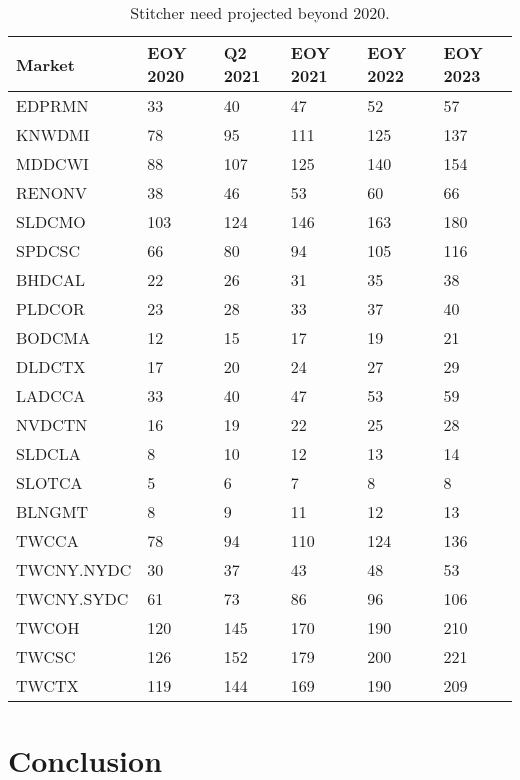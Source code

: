 \documentclass{article}
\begin{document}
\begin{table}
\begin{tabular}{|l|p{16mm}|p{16mm}|p{16mm}|p{16mm}|p{16mm}|} 
\hline Market & EOY 2020 & Q2 2021 & EOY 2021 & EOY 2022 & EOY 2023\\
\hline EDPRMN & 33  &   40 & 	47 & 	52 & 	57 \\
\hline KNWDMI & 78 & 	95 & 	111 & 	125 & 	137 \\
\hline MDDCWI & 88 & 	107 & 	125 & 	140 & 	154 \\
\hline RENONV & 38 & 	46 & 	53 & 	60 & 	66 \\
\hline SLDCMO & 103 & 	124 & 	146 & 	163 & 	180 \\
\hline SPDCSC & 66 & 	80 & 	94 & 	105 & 	116 \\
\hline BHDCAL & 22 & 	26 & 	31 & 	35 & 	38 \\
\hline PLDCOR & 23 & 	28 & 	33 & 	37 & 	40 \\
\hline BODCMA & 12 & 	15 & 	17 & 	19 & 	21 \\
\hline DLDCTX & 17 & 	20 & 	24 & 	27 & 	29 \\
\hline LADCCA & 33 & 	40 & 	47 & 	53 & 	59 \\
\hline NVDCTN & 16 & 	19 & 	22 & 	25 & 	28 \\
\hline SLDCLA & 8 & 	10 & 	12 & 	13 & 	14 \\
\hline SLOTCA & 5 & 	6 & 	7 & 	8 & 	8 \\
\hline BLNGMT & 8 & 	9 & 	11 & 	12 & 	13 \\
\hline TWCCA & 78 & 	94 & 	110 & 	124 & 	136 \\
\hline TWCNY.NYDC & 30 & 	37 & 	43 & 	48 & 	53 \\
\hline TWCNY.SYDC & 61 & 	73 & 	86 & 	96 & 	106 \\
\hline TWCOH & 120 & 	145 & 	170 & 	190 & 	210 \\
\hline TWCSC & 126 & 	152 & 	179 & 	200 & 	221 \\
\hline TWCTX & 119 & 	144 & 	169 & 	190 & 	209 \\
\hline 
\end{tabular}
\caption{\label{TABLE-StitchersNeeded5YR}Stitcher need projected beyond 2020.} 
\end{table}



\section{Conclusion}
\label{SECTION-Conclusion}
\end{document}
